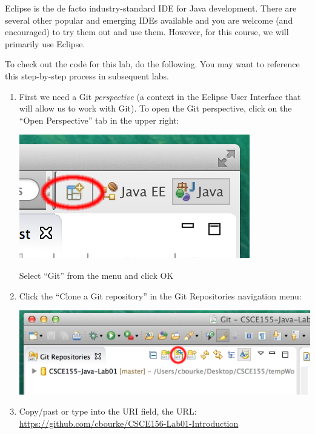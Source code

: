 \documentclass[12pt]{scrartcl}
\begin{document}
Eclipse is the de facto industry-standard IDE for Java development.  There
are several other popular and emerging IDEs available and you are welcome
(and encouraged) to try them out and use them.  However, for this course, we
will primarily use Eclipse.

To check out the code for this lab, do the following.  You may want
to reference this step-by-step process in subsequent labs.

\begin{enumerate}
  \item First we need a Git \emph{perspective} (a context in the Eclipse User Interface that 
  	will allow us to work with Git).  To open the Git perspective, click on the ``Open Perspective''
	tab in the upper right:
	\begin{center}
	\includegraphics[scale=0.50]{images/eclipseOpenPerspectiveMarkUp}
	\end{center}
	Select ``Git'' from the menu and click OK
  \item Click the ``Clone a Git repository'' in the Git Repositories navigation menu:
  	\begin{center}
	\includegraphics[scale=0.50]{images/eclipseGitRepoMarkUp}
	\end{center}
  \item Copy/past or type into the URI field, the URL: \\
  	\url{https://github.com/cbourke/CSCE156-Lab01-Introduction}
  	\begin{center}

\end{center}
\end{enumerate}
\end{document}
